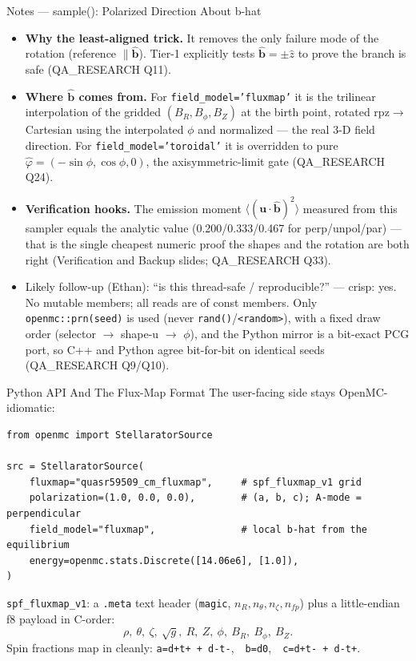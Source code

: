 \documentclass[11pt,aspectratio=169]{beamer}
\newcommand{\bhat}{\hat{\mathbf{b}}}
\begin{document}
\begin{frame}[allowframebreaks]{Notes --- sample(): Polarized Direction About b-hat}
{\begin{itemize}
\begin{itemize}
      \item Return \texttt{(local.x*ex + local.y*ey + local.z*b).normalized()}: express the local
            direction in the global triad. The final \texttt{.normalized()} enforces $|u|=1$.
      \end{itemize}
\item \textbf{Why the least-aligned trick.} It removes the only failure mode of the rotation
      (reference $\parallel\bhat$). Tier-1 explicitly tests $\bhat=\pm\hat z$ to prove the branch is
      safe (QA\_RESEARCH Q11).
\item \textbf{Where $\bhat$ comes from.} For \texttt{field\_model='fluxmap'} it is the trilinear
      interpolation of the gridded $(B_R,B_\phi,B_Z)$ at the birth point, rotated rpz$\to$Cartesian
      using the interpolated $\phi$ and normalized --- the real 3-D field direction. For
      \texttt{field\_model='toroidal'} it is overridden to pure $\hat\varphi=(-\sin\phi,\cos\phi,0)$,
      the axisymmetric-limit gate (QA\_RESEARCH Q24).
\item \textbf{Verification hooks.} The emission moment $\langle(\mathbf{u}\cdot\bhat)^2\rangle$
      measured from this sampler equals the analytic value (0.200/0.333/0.467 for perp/unpol/par) ---
      that is the single cheapest numeric proof the shapes and the rotation are both right
      (Verification and Backup slides; QA\_RESEARCH Q33).
\item Likely follow-up (Ethan): ``is this thread-safe / reproducible?'' --- crisp: yes. No mutable
      members; all reads are of const members. Only \texttt{openmc::prn(seed)} is used (never
      \texttt{rand()}/\texttt{<random>}), with a fixed draw order (selector $\to$ shape-u $\to$ $\phi$),
      and the Python mirror is a bit-exact PCG port, so C++ and Python agree bit-for-bit on identical
      seeds (QA\_RESEARCH Q9/Q10).
\end{itemize}
}
\end{frame}

\begin{frame}[fragile]{Python API And The Flux-Map Format}
The user-facing side stays OpenMC-idiomatic:
\begin{verbatim}
from openmc import StellaratorSource

src = StellaratorSource(
    fluxmap="quasr59509_cm_fluxmap",     # spf_fluxmap_v1 grid
    polarization=(1.0, 0.0, 0.0),        # (a, b, c); A-mode = perpendicular
    field_model="fluxmap",               # local b-hat from the equilibrium
    energy=openmc.stats.Discrete([14.06e6], [1.0]),
)
\end{verbatim}
\texttt{spf\_fluxmap\_v1}: a \texttt{.meta} text header (\texttt{magic},
$n_R,n_\theta,n_\zeta,n_{fp}$) plus a little-endian f8 payload in C-order:
\[
\rho,\ \theta,\ \zeta,\ \sqrt{g},\ R,\ Z,\ \phi,\ B_R,\ B_\phi,\ B_Z .
\]
Spin fractions map in cleanly: \texttt{a=d+t+ + d-t-},\ \ \texttt{b=d0},\ \
\texttt{c=d+t- + d-t+}.
\end{frame}
\end{document}
